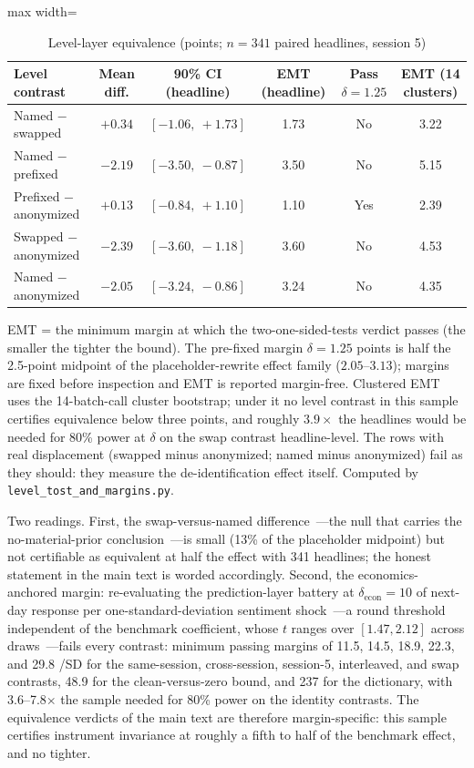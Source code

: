 \begin{table}[htbp]
\centering
\small
\caption{Level-layer equivalence (points; $n=341$ paired headlines, session 5)}
\label{tab:leveltost}
\begin{adjustbox}{max width=\textwidth}
\begin{tabular}{lccccc}
\toprule
Level contrast & Mean diff. & 90\% CI (headline) & EMT (headline) & Pass $\delta{=}1.25$ & EMT (14 clusters) \\
\midrule
Named $-$ swapped & $+0.34$ & $[-1.06,\ +1.73]$ & 1.73 & No & 3.22 \\
Named $-$ prefixed & $-2.19$ & $[-3.50,\ -0.87]$ & 3.50 & No & 5.15 \\
Prefixed $-$ anonymized & $+0.13$ & $[-0.84,\ +1.10]$ & 1.10 & Yes & 2.39 \\
Swapped $-$ anonymized & $-2.39$ & $[-3.60,\ -1.18]$ & 3.60 & No & 4.53 \\
Named $-$ anonymized & $-2.05$ & $[-3.24,\ -0.86]$ & 3.24 & No & 4.35 \\
\bottomrule
\end{tabular}
\end{adjustbox}
\begin{tablenotes}[flushleft]\footnotesize
\item EMT = the minimum margin at which the two-one-sided-tests verdict passes (the smaller the tighter the bound). The pre-fixed margin $\delta=1.25$ points is half the 2.5-point midpoint of the placeholder-rewrite effect family ($2.05$--$3.13$); margins are fixed before inspection and EMT is reported margin-free. Clustered EMT uses the 14-batch-call cluster bootstrap; under it no level contrast in this sample certifies equivalence below three points, and roughly $3.9\times$ the headlines would be needed for 80\% power at $\delta$ on the swap contrast headline-level. The rows with real displacement (swapped minus anonymized; named minus anonymized) fail as they should: they measure the de-identification effect itself. Computed by \texttt{level\_tost\_and\_margins.py}.
\end{tablenotes}
\end{table}

Two readings. First, the swap-versus-named difference~---the null that carries the no-material-prior conclusion~---is small (13\% of the placeholder midpoint) but not certifiable as equivalent at half the effect with 341 headlines; the honest statement in the main text is worded accordingly. Second, the economics-anchored margin: re-evaluating the prediction-layer battery at $\delta_{\mathrm{econ}}=10$ \bps{} of next-day response per one-standard-deviation sentiment shock~---a round threshold independent of the benchmark coefficient, whose $t$ ranges over $[1.47, 2.12]$ across draws~---fails every contrast: minimum passing margins of 11.5, 14.5, 18.9, 22.3, and 29.8 \bps/SD for the same-session, cross-session, session-5, interleaved, and swap contrasts, 48.9 for the clean-versus-zero bound, and 237 for the dictionary, with 3.6--7.8$\times$ the sample needed for 80\% power on the identity contrasts. The equivalence verdicts of the main text are therefore margin-specific: this sample certifies instrument invariance at roughly a fifth to half of the benchmark effect, and no tighter.

